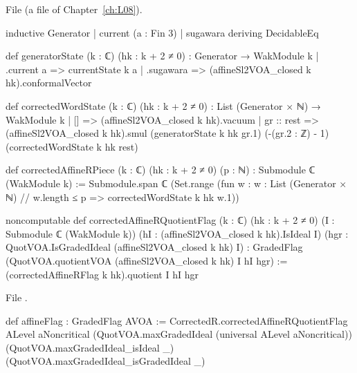 \noindent File  (a file of Chapter~\ref{ch:L08}).
\begin{leancode}
inductive Generator
  | current (a : Fin 3)
  | sugawara
  deriving DecidableEq

def generatorState (k : ℂ) (hk : k + 2 ≠ 0) : Generator → WakModule k
  | .current a => currentState k a
  | .sugawara => (affineSl2VOA_closed k hk).conformalVector

def correctedWordState (k : ℂ) (hk : k + 2 ≠ 0) :
    List (Generator × ℕ) → WakModule k
  | [] => (affineSl2VOA_closed k hk).vacuum
  | gr :: rest =>
      (affineSl2VOA_closed k hk).smul (generatorState k hk gr.1)
        (-(gr.2 : ℤ) - 1) (correctedWordState k hk rest)

def correctedAffineRPiece (k : ℂ) (hk : k + 2 ≠ 0) (p : ℕ) :
    Submodule ℂ (WakModule k) :=
  Submodule.span ℂ (Set.range (fun w : {w : List (Generator × ℕ) // w.length ≤ p} =>
    correctedWordState k hk w.1))

noncomputable def correctedAffineRQuotientFlag (k : ℂ) (hk : k + 2 ≠ 0)
    (I : Submodule ℂ (WakModule k))
    (hI : (affineSl2VOA_closed k hk).IsIdeal I)
    (hgr : QuotVOA.IsGradedIdeal (affineSl2VOA_closed k hk) I) :
    GradedFlag (QuotVOA.quotientVOA (affineSl2VOA_closed k hk) I hI hgr) :=
  (correctedAffineRFlag k hk).quotient I hI hgr

\end{leancode}
\noindent File .
\begin{leancode}
def affineFlag : GradedFlag AVOA :=
  CorrectedR.correctedAffineRQuotientFlag ALevel aNoncritical
    (QuotVOA.maxGradedIdeal (universal ALevel aNoncritical))
    (QuotVOA.maxGradedIdeal_isIdeal _)
    (QuotVOA.maxGradedIdeal_isGradedIdeal _)
\end{leancode}

